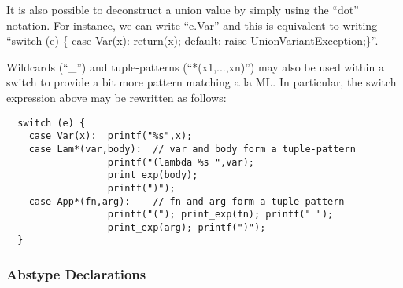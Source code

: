 \documentclass[titlepage,10pt]{article}
\begin{document}
It is also possible to deconstruct a union value by simply using the
``dot'' notation.  For instance, we can write ``e.Var'' and this is
equivalent to writing ``switch (e) \{ case Var(x): return(x); default:
raise UnionVariantException;\}''.

Wildcards (``{\_}'') and tuple-patterns (``*(x1,...,xn)'') may also be
used within a switch to provide a bit more pattern matching a la ML.  In
particular, the switch expression above may be rewritten as follows:


\begin{verbatim}
  switch (e) {
    case Var(x):  printf("%s",x);
    case Lam*(var,body):  // var and body form a tuple-pattern
                  printf("(lambda %s ",var);
                  print_exp(body);
                  printf(")");
    case App*(fn,arg):    // fn and arg form a tuple-pattern
                  printf("("); print_exp(fn); printf(" ");
                  print_exp(arg); printf(")");
  }
\end{verbatim}


\subsubsection{Abstype Declarations}

\end{document}
